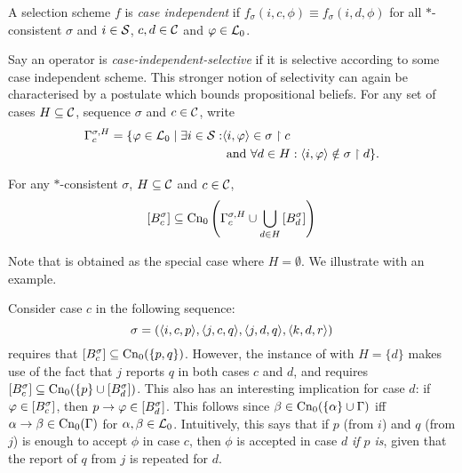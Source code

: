 \begin{definition}
    \label{kr_def_case_independent_selectivity}
    A selection scheme $f$ is \emph{case independent} if $f_\sigma(i, c, \phi)
    \equiv f_\sigma(i, d, \phi)$ for all $\ast$-consistent $\sigma$ and $i \in
    \mathcal{S}$, $c, d \in \mathcal{C}$ and $\varphi \in \mathcal{L}{}_0$.
\end{definition}

Say an operator is \emph{case-independent-selective} if it is selective
according to some case independent scheme. This stronger notion of selectivity
can again be characterised by a postulate which bounds propositional beliefs.
For any set of cases $H \subseteq \mathcal{C}$, sequence $\sigma$ and $c \in \mathcal{C}$, write
\begin{align*}
    \Gamma^{\sigma,H}_c
    = \{
        \varphi \in \mathcal{L}{}_0
        \mid
        \exists i \in \mathcal{S}:
            &\langle {i, \varphi} \rangle \in \sigma \upharpoonright c \\
            &\text{ and }
            \forall d \in H : \langle {i, \varphi} \rangle \notin \sigma \upharpoonright d
    \}.
\end{align*}

\begin{axiom}[\hboundedness{}]
    For any $\ast$-consistent $\sigma$, $H \subseteq \mathcal{C}$ and $c \in \mathcal{C}$,
    \[
        \left[{B^\sigma_c}\right]
            \subseteq
            \operatorname{Cn}_0\left(
                \Gamma^{\sigma,H}_c
                \cup
                \bigcup_{d \in H}{
                    \left[{B^\sigma_d}\right]
                }
            \right)
    \]
\end{axiom}

Note that \boundedness{} is obtained as the special case where $H =
\emptyset$. We illustrate with an example.

\begin{example}
    \label{kr_ex_hprop}
    Consider case $c$ in the following sequence:
    \[
        \sigma
        = (
            \langle {i, c, p} \rangle,
            \langle {j, c, q} \rangle,
            \langle {j, d, q} \rangle,
            \langle {k, d, r} \rangle
        )
    \]
    \boundedness{} requires that $\left[{B^\sigma_c}\right] \subseteq \operatorname{Cn}_0(\{p,
    q\})$. However, the instance of \hboundedness{} with $H = \{d\}$ makes use
    of the fact that $j$ reports $q$ in both cases $c$ and $d$, and requires
    $\left[{B^\sigma_c}\right] \subseteq \operatorname{Cn}_0(\{p\} \cup
    \left[{B^\sigma_d}\right])$.
    This also has an interesting implication for case $d$: if $\varphi \in
    \left[{B^\sigma_c}\right]$, then $p \rightarrow \varphi \in
    \left[{B^\sigma_d}\right]$. This follows since $\beta \in \operatorname{Cn}_0(\{\alpha\}
    \cup \Gamma)$ iff $\alpha \rightarrow \beta \in \operatorname{Cn}_0(\Gamma)$ for
    $\alpha, \beta \in \mathcal{L}{}_0$.
    Intuitively, this says that if $p$ (from $i$) and $q$
    (from $j$) is enough to accept $\phi$ in case $c$, then $\phi$ is
    accepted in case $d$ \emph{if $p$ is}, given that the report of $q$ from
    $j$ is repeated for $d$.

\end{example}

